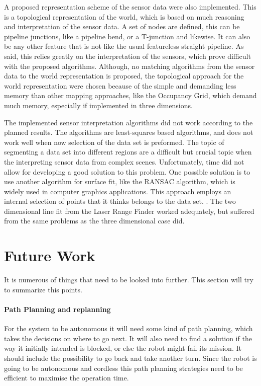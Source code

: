 A proposed representation scheme of the sensor data were also implemented. This is a
topological representation of the world, which is based on much reasoning and
interpretation of the sensor data. A set of nodes are defined, this can be pipeline
junctions, like a pipeline bend, or a T-junction and likewise. It can also be any other
feature that is not like the usual featureless straight pipeline. As said, this relies
greatly on the interpretation of the sensors, which prove difficult with the proposed
algorithms. Although, no matching algorithms from the sensor data to the world
representation is proposed, the topological approach for the world representation were
chosen because of the simple and demanding less memory than other mapping approaches, like
the Occupancy Grid, which demand much memory, especially if implemented in three
dimensions. 

The implemented sensor interpretation algorithms did not work according to the planned
results. The algorithms are least-squares based algorithms, and does not work well when
now selection of the data set is preformed. The topic of segmenting a data set into
different regions are a difficult but crucial topic when the interpreting sensor data from
complex scenes. Unfortunately, time did not allow for developing a good solution to this
problem. One possible solution is to use another algorithm for surface fit, like the
RANSAC algorithm, which is widely used in computer graphics applications. This approach
employs an internal selection of points that it thinks belongs to the data set.
\cite{ransac}. The two dimensional line fit from the Laser Range Finder worked adequately,
but suffered from the same problems as the three dimensional case did. 



\section{Future Work}
It is numerous of things that need to be looked into further. This section will try to 
summarize this points. 

\paragraph{Path Planning and replanning} For the system to be autonomous it will
need some kind of path planning, which takes the decisions on where to go next. It will
also need to find a solution if the way it initially intended is blocked, or else the
robot might fail its mission. It should include the possibility to go back and take
another turn. Since the robot is going to be autonomous and cordless this path planning
strategies need to be efficient to maximise the operation time. 

